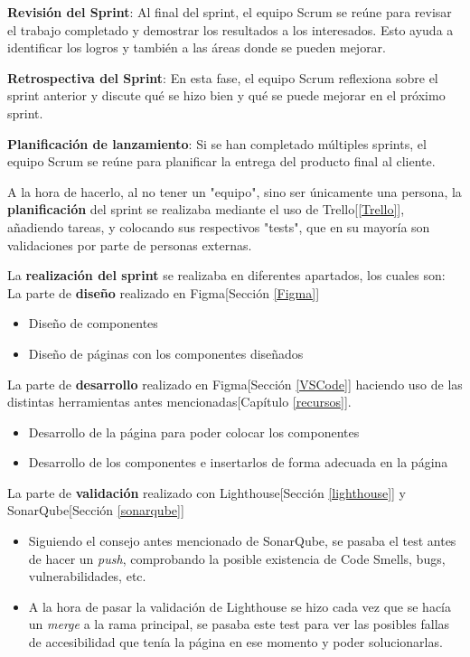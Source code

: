 \textbf{Revisión del Sprint}: Al final del sprint, el equipo Scrum se reúne para revisar
el trabajo completado y demostrar los resultados a los interesados. Esto ayuda
a identificar los logros y también a las áreas donde se pueden mejorar.

\textbf{Retrospectiva del Sprint}: En esta fase, el equipo Scrum reflexiona sobre el
sprint anterior y discute qué se hizo bien y qué se puede mejorar en el próximo
sprint.

\textbf{Planificación de lanzamiento}: Si se han completado múltiples sprints, el equipo
Scrum se reúne para planificar la entrega del producto final al cliente.

A la hora de hacerlo, al no tener un "equipo", sino ser únicamente una persona,
la \textbf{planificación} del sprint se realizaba mediante el uso de
Trello[\ref{Trello}], añadiendo tareas, y colocando sus respectivos "tests",
que en su mayoría son validaciones por parte de personas externas.

La \textbf{realización del sprint} se realizaba en diferentes apartados, los
cuales son: \\

La parte de \textbf{diseño} realizado en Figma[Sección \ref{Figma}]
\begin{itemize}
    \item Diseño de componentes
    \item Diseño de páginas con los componentes diseñados
\end{itemize}

La parte de \textbf{desarrollo} realizado en Figma[Sección \ref{VSCode}]
haciendo uso de las distintas herramientas antes mencionadas[Capítulo
        \ref{recursos}].
\begin{itemize}
    \item Desarrollo de la página para poder colocar los componentes
    \item Desarrollo de los componentes e insertarlos de forma adecuada en la página
\end{itemize}

La parte de \textbf{validación} realizado con Lighthouse[Sección
        \ref{lighthouse}] y SonarQube[Sección \ref{sonarqube}]
\begin{itemize}
    \item Siguiendo el consejo antes mencionado de SonarQube, se pasaba el test antes de
          hacer un \textit{push}, comprobando la posible existencia de Code Smells, bugs,
          vulnerabilidades, etc.
    \item A la hora de pasar la validación de Lighthouse se hizo cada vez que se hacía un
          \textit{merge} a la rama principal, se pasaba este test para ver las posibles
          fallas de accesibilidad que tenía la página en ese momento y poder
          solucionarlas.\end{itemize}